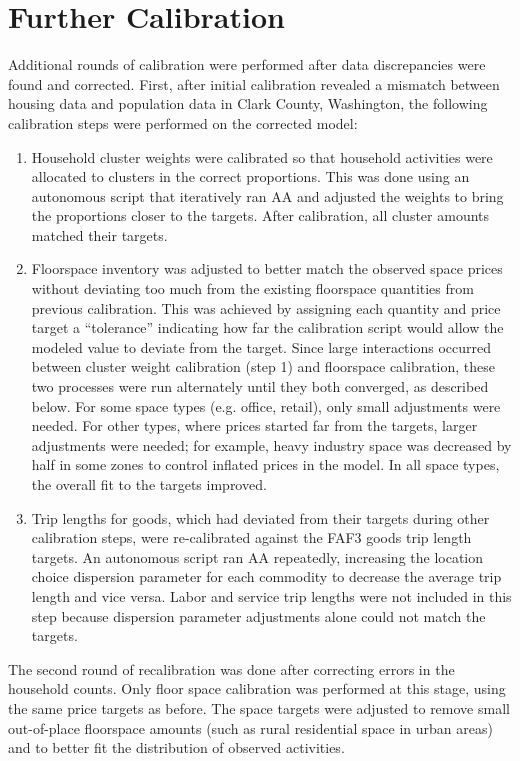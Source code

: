\section{Further Calibration}
Additional rounds of calibration were performed after data discrepancies were found and corrected. First, after initial calibration revealed a mismatch between housing data and population data in Clark County, Washington, the following calibration steps were performed on the corrected model:
\begin{enumerate}
\item Household cluster weights were calibrated so that household activities were allocated to clusters in the correct proportions. This was done using an autonomous script that iteratively ran AA and adjusted the weights to bring the proportions closer to the targets. After calibration, all cluster amounts matched their targets.
\item Floorspace inventory was adjusted to better match the observed space prices without deviating too much from the existing floorspace quantities from previous calibration. This was achieved by assigning each quantity and price target a ``tolerance'' indicating how far the calibration script would allow the modeled value to deviate from the target. Since large interactions occurred between cluster weight calibration (step 1) and floorspace calibration, these two processes were run alternately until they both converged, as described below. For some space types (e.g. office, retail), only small adjustments were needed. For other types, where prices started far from the targets, larger adjustments were needed; for example, heavy industry space was decreased by half in some zones to control inflated prices in the model. In all space types, the overall fit to the targets improved.
\item Trip lengths for goods, which had deviated from their targets during other calibration steps, were re-calibrated against the FAF3 goods trip length targets. An autonomous script ran AA repeatedly, increasing the location choice dispersion parameter for each commodity to decrease the average trip length and vice versa. Labor and service trip lengths were not included in this step because dispersion parameter adjustments alone could not match the targets.
\end{enumerate}

The second round of recalibration was done after correcting errors in the household counts. Only floor space calibration was performed at this stage, using the same price targets as before. The space targets were adjusted to remove small out-of-place floorspace amounts (such as rural residential space in urban areas) and to better fit the distribution of observed activities. 

